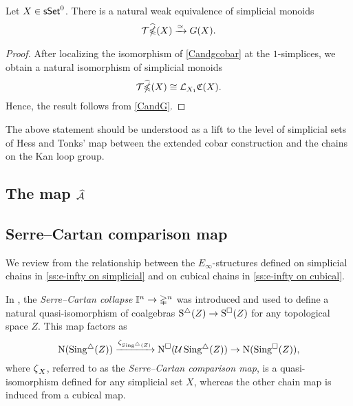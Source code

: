 \begin{corollary} \label{widehatgcobarandG}
	Let $X \in \mathsf{sSet}^0$.
	There is a natural weak equivalence of simplicial monoids
	$$\mathcal{T} \widehat{\operatorname{\mathbb{\Omega}}}(X) \xrightarrow{\simeq}G(X).$$
\end{corollary}

\begin{proof}
	After localizing the isomorphism of \cref{Candgcobar} at the $1$-simplices, we obtain a natural isomorphism of simplicial monoids
	$$\mathcal{T} \widehat{\operatorname{\mathbb{\Omega}}}(X) \cong \mathcal{L}_{X_1}\mathfrak{C}(X).$$
	Hence, the result follows from \cref{CandG}.
\end{proof}

The above statement should be understood as a lift to the level of simplicial sets of Hess and Tonks' map between the extended cobar construction and the chains on the Kan loop group.

\subsection{The map $\operatorname{\mathcal{\widehat{A}}}$}


\subsection{Serre--Cartan comparison map}

We review from \cite{medina2021cubical} the relationship between the $E_\infty$-structures defined on simplicial chains in \cref{ss:e-infty on simplicial} and on cubical chains in \cref{ss:e-infty on cubical}.

In \cite[sect]{serre1951homologie}, the \textit{Serre--Cartan collapse} $\mathbb{I}^n \to \mathbb{\Delta}^n$ was introduced and used to define a natural quasi-isomorphism of coalgebras $\operatorname{S^{\triangle}}(Z) \to \operatorname{S^{\square}}(Z)$ for any topological space $Z$.
This map factors as
\begin{equation*}
\operatorname{N}(\operatorname{Sing^{\triangle}}(Z)) \xrightarrow{\operatorname{\zeta}_{\operatorname{Sing^{\triangle}}(Z)}}
\operatorname{N^{\square}}(\mathcal{U} \operatorname{Sing^{\triangle}}(Z)) \to
\operatorname{N}(\operatorname{Sing^{\square}}(Z)),
\end{equation*}
where $\operatorname{\zeta}_X$, referred to as the \textit{Serre--Cartan comparison map}, is a quasi-isomorphism defined for any simplicial set $X$, whereas the other chain map is induced from a cubical map.

